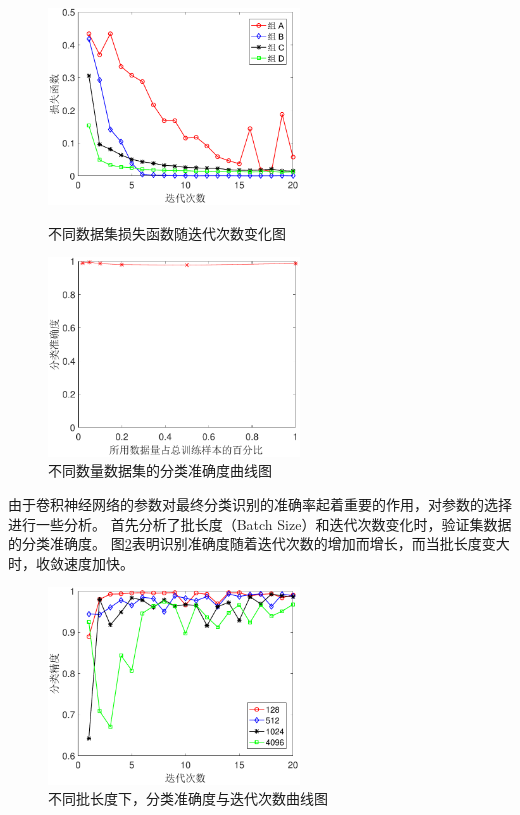 \begin{figure}[hbt]
	\centering
	\begin{minipage}{7cm}
		\includegraphics[width=6.67cm]{figures/othr/group_results}
		\caption{不同数据集损失函数随迭代次数变化图}
		\label{fig:group_results}
	\end{minipage}
	\hspace{10pt}
	\begin{minipage}{7cm}
		\includegraphics[width=6.67cm]{figures/othr/sizes}
		\caption{不同数量数据集的分类准确度曲线图}
		\label{fig:sizes}
	\end{minipage}

\end{figure}

由于卷积神经网络的参数对最终分类识别的准确率起着重要的作用，对参数的选择进行一些分析。
首先分析了批长度（Batch Size）和迭代次数变化时，验证集数据的分类准确度。
图\ref{fig:epoch}表明识别准确度随着迭代次数的增加而增长，而当批长度变大时，收敛速度加快。
\begin{figure}[hbt]
	\centering
	\includegraphics[width=6.67cm]{figures/othr/epoch}
	\caption{不同批长度下，分类准确度与迭代次数曲线图}
	\label{fig:epoch}
\end{figure}

